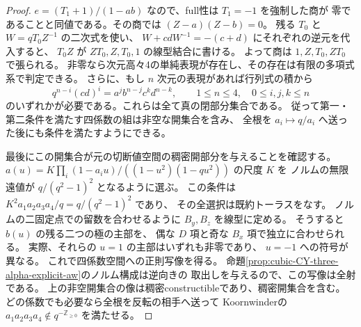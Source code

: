 \begin{proof}
$e=(T_1+1)/(1-ab)$ なので、full性は $T_1=-1$ を強制した商が
零であることと同値である。その商では $(Z-a)(Z-b)=0$。
残る $T_0$ と $W=qT_0Z^{-1}$ の二次式を使い、
$W+cd W^{-1}=-(c+d)$ にそれぞれの逆元を代入すると、
$T_0Z$ が $ZT_0, Z,T_0,1$ の線型結合に書ける。
よって商は $1,Z,T_0,ZT_0$ で張られる。
非零なら次元高々4の単純表現が存在し、その存在は有限の多項式系で判定できる。
さらに、もし $n$ 次元の表現があれば行列式の積から
\[
 q^{n-i}(cd)^i=a^j b^{n-j}c^k d^{n-k},
 \qquad 1\le n\le4,\quad 0\le i,j,k\le n
\]
のいずれかが必要である。これらは全て真の閉部分集合である。
従って第一・第二条件を満たす四係数の組は非空な開集合を含み、
全根を $a_i\mapsto q/a_i$ へ送った後にも条件を満たすようにできる。

最後にこの開集合が元の切断値空間の稠密開部分を与えることを確認する。
$a(u)=K\prod_i(1-a_i u)/((1-u^2)(1-qu^2))$ の尺度 $K$ を
ノルムの無限遠値が $q/(q^2-1)^2$ となるように選ぶ。
この条件は $K^2 a_1a_2a_3a_4/q=q/(q^2-1)^2$ であり、
その全選択は既約トーラスをなす。
ノルムの二固定点での留数を合わせるように $B_y,B_z$ を線型に定める。
そうすると $b(u)$ の残る二つの極の主部を、
偶な $D$ 項と奇な $B_x$ 項で独立に合わせられる。
実際、それらの $u=1$ の主部はいずれも非零であり、
$u=-1$ への符号が異なる。
これで四係数空間への正則写像を得る。
命題\ref{prop:cubic-CY-three-alpha-explicit-aw}のノルム構成は逆向きの
取出しを与えるので、この写像は全射である。
上の非空開集合の像は稠密constructibleであり、稠密開集合を含む。
どの係数でも必要なら全根を反転の相手へ送って
Koornwinderの $a_1a_2a_3a_4\notin q^{-\mathbb Z_{\ge0}}$ を満たせる。
\end{proof}

